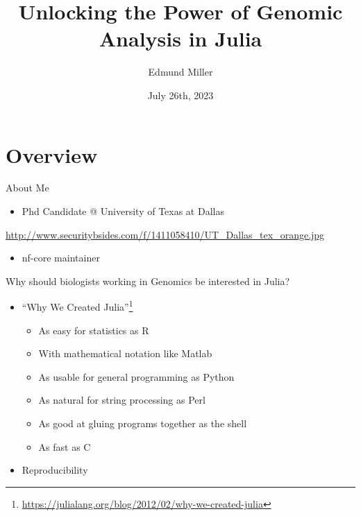 \documentclass[bigger]{beamer}
\author{Edmund Miller}
\date{July 26th, 2023}
\title{Unlocking the Power of Genomic Analysis in Julia}
\begin{document}
\maketitle

\section*{Overview}
\label{sec:org8628067}
\begin{frame}[label={sec:orgbd6cdda}]{About Me}
\begin{itemize}
\item Phd Candidate @ University of Texas at Dallas
\end{itemize}
\url{http://www.securitybsides.com/f/1411058410/UT\_Dallas\_tex\_orange.jpg}
\begin{itemize}
\item nf-core maintainer
\end{itemize}
\begin{center}

\end{center}
\end{frame}
\begin{frame}[label={sec:orgdf65936}]{Why should biologists working in Genomics be interested in Julia?}
\begin{itemize}
\item ``Why We Created Julia''\footnote{\url{https://julialang.org/blog/2012/02/why-we-created-julia}}
\begin{itemize}
\item As easy for statistics as R
\item With mathematical notation like Matlab
\item As usable for general programming as Python
\item As natural for string processing as Perl
\item As good at gluing programs together as the shell
\item As fast as C
\end{itemize}

\item Reproducibility
\end{itemize}
\end{frame}
\end{document}
